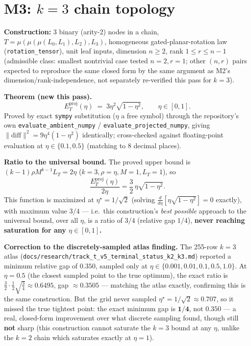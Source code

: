 \section*{M3: $k=3$ chain topology}

\textbf{Construction:} 3 binary (arity-2) nodes in a chain,
$T = \mu(\mu(\mu(L_0,L_1),L_2),L_3)$, homogeneous gated-planar-rotation
law (\texttt{rotation\_tensor}), unit leaf inputs, dimension $n\ge2$,
rank $1\le r\le n-1$ (admissible class: smallest nontrivial case tested
$n=2,r=1$; other $(n,r)$ pairs expected to reproduce the same closed form
by the same argument as M2's dimension/rank-independence, not
separately re-verified this pass for $k=3$).

\textbf{Theorem (new this pass).}
\[
  E_T^{\mathrm{proj}}(\eta) \;=\; 3\eta^2\sqrt{1-\eta^2}, \qquad \eta\in[0,1].
\]
Proved by exact \texttt{sympy} substitution ($\eta$ a free symbol) through
the repository's own \texttt{evaluate\_ambient\_numpy} /
\texttt{evaluate\_projected\_numpy}, giving
$\|\text{diff}\|^2 = 9\eta^4(1-\eta^2)$ identically; cross-checked against
floating-point evaluation at $\eta\in\{0.1,0.5\}$ (matching to 8 decimal
places).

\textbf{Ratio to the universal bound.} The proved upper bound is
$(k-1)\rho M^{k-1}L_T = 2\eta$ ($k=3,\rho=\eta,M=1,L_T=1$), so
\[
  \frac{E_T^{\mathrm{proj}}(\eta)}{2\eta} = \frac{3}{2}\,\eta\sqrt{1-\eta^2}.
\]
This function is maximized at $\eta^\star = 1/\sqrt2$ (solving
$\frac{d}{d\eta}[\eta\sqrt{1-\eta^2}]=0$ exactly), with maximum value
$\boxed{3/4}$ — i.e.\ this construction's \emph{best possible} approach
to the universal bound, over all $\eta$, is a ratio of $3/4$
(relative gap $1/4$), \textbf{never reaching saturation for any
$\eta\in[0,1]$.}

\textbf{Correction to the discretely-sampled atlas finding.} The 255-row
$k=3$ atlas (\texttt{docs/research/track\_t\_v5\_terminal\_status\_k2\_k3.md})
reported a minimum relative gap of $0.350$, sampled only at
$\eta\in\{0.001,0.01,0.1,0.5,1.0\}$. At $\eta=0.5$ (the closest sampled
point to the true optimum), the exact ratio is
$\frac{3}{2}\cdot\frac12\sqrt{\frac34} \approx 0.6495$, gap $\approx
0.3505$ — matching the atlas exactly, confirming this is the same
construction. But the grid never sampled $\eta^\star=1/\sqrt2\approx0.707$,
so it missed the true tightest point: the exact minimum gap is
$\mathbf{1/4}$, not $0.350$ — a real, closed-form improvement over what
discrete sampling found, though still \textbf{not} sharp (this
construction cannot saturate the $k=3$ bound at any $\eta$, unlike the
$k=2$ chain which saturates exactly at $\eta=1$).
